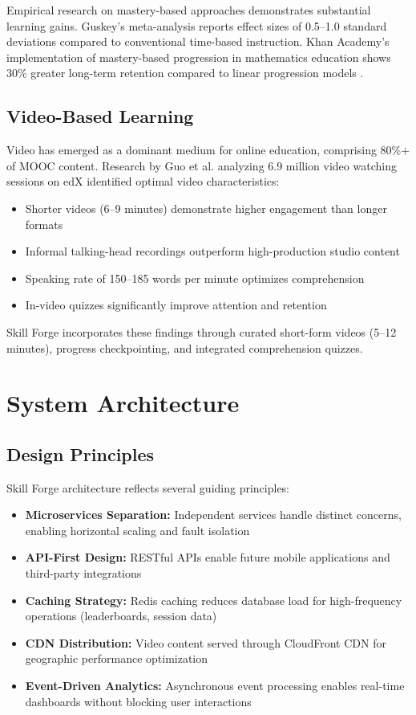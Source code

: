 \documentclass[journal]{IEEEtran}
\begin{document}
Empirical research on mastery-based approaches demonstrates substantial learning gains. Guskey's meta-analysis \cite{guskey2007} reports effect sizes of 0.5--1.0 standard deviations compared to conventional time-based instruction. Khan Academy's implementation of mastery-based progression in mathematics education shows 30\% greater long-term retention compared to linear progression models \cite{murphy2022}.

\subsection{Video-Based Learning}

Video has emerged as a dominant medium for online education, comprising 80\%+ of MOOC content. Research by Guo et al. \cite{guo2014} analyzing 6.9 million video watching sessions on edX identified optimal video characteristics:

\begin{itemize}
    \item Shorter videos (6--9 minutes) demonstrate higher engagement than longer formats
    \item Informal talking-head recordings outperform high-production studio content
    \item Speaking rate of 150--185 words per minute optimizes comprehension
    \item In-video quizzes significantly improve attention and retention
\end{itemize}

Skill Forge incorporates these findings through curated short-form videos (5--12 minutes), progress checkpointing, and integrated comprehension quizzes.

\section{System Architecture}
\label{sec:architecture}

\subsection{Design Principles}

Skill Forge architecture reflects several guiding principles:

\begin{itemize}
    \item \textbf{Microservices Separation:} Independent services handle distinct concerns, enabling horizontal scaling and fault isolation
    \item \textbf{API-First Design:} RESTful APIs enable future mobile applications and third-party integrations
    \item \textbf{Caching Strategy:} Redis caching reduces database load for high-frequency operations (leaderboards, session data)
    \item \textbf{CDN Distribution:} Video content served through CloudFront CDN for geographic performance optimization
    \item \textbf{Event-Driven Analytics:} Asynchronous event processing enables real-time dashboards without blocking user interactions
\end{itemize}
\end{document}
